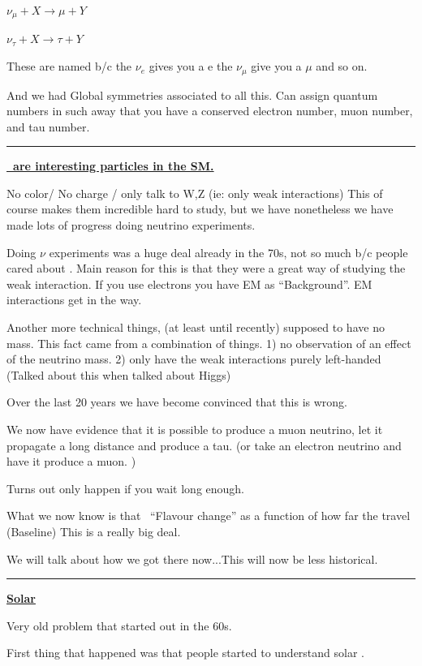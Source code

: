 {\begin{center}
$\nu_\mu + X \rightarrow \mu + Y $

$\nu_\tau + X  \rightarrow \tau + Y$
\end{center}

These are named b/c the $\nu_e$ gives you a e the $\nu_\mu$ give you a $\mu$ and so on. 

And we had Global symmetries associated to all this. 
Can assign quantum numbers in such away that you have a  conserved electron number, muon number, and tau number.

\noindent\rule{\textwidth}{1pt}

\underline{\textbf{\nus\ are interesting particles in the SM. }}

No color/ No charge / only talk to W,Z  (ie: only weak interactions) 
This of course makes them incredible hard to study, but we have nonetheless we have made lots of progress doing neutrino experiments. 

Doing $\nu$ experiments was a huge deal already in the 70s, not so much b/c people cared about \nus. 
Main reason for this is that they were a great way of studying the weak interaction. 
If you use electrons you have EM as ``Background''. 
EM interactions get in the way. 

Another more technical things, (at least until recently) \nus supposed to have no mass. 
This fact came from a combination of things. 
1) no observation of an effect of the neutrino mass. 
2) \nus only have the weak interactions purely left-handed (Talked about this when talked about Higgs)

Over the last 20 years we have become convinced that this is wrong. 

We now have evidence that it is possible to produce a muon neutrino, let it propagate a long distance and produce a tau. 
(or take an electron neutrino and have it produce a muon. )

Turns out only happen if you wait long enough. 

What we now know is that \nus\ ``Flavour change'' as a function of how far the \nus travel (Baseline)
This is a really big deal. 

We will talk about how we got there now...This will now be less historical. 

\noindent\rule{\textwidth}{1pt}

\underline{\textbf{Solar \nus}}

Very old problem that started out in the 60s. 

First thing that happened was that people started to understand solar \nus.\

}
